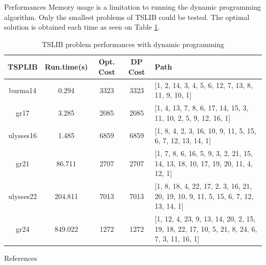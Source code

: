 \documentclass[../report.tex]{subfiles}
\begin{document}
\begin{subsection}{Performances}
Memory usage is a limitation to running the dynamic programming algorithm. Only the smallest problems of TSLIB could be tested. The optimal solution is obtained each time as seen on Table \ref{table:dpt1}.

\begin{table}[!h]
\centering
\footnotesize
\begin{tabular}{||c||c|c|c|l||}
\hline
\hline
\bf TSPLIB & \bf Run.time(s) & \bf Opt. Cost & \bf DP Cost & \bf Path \\
\hline
\hline
burma14 & 0.294 & 3323 & 3323 & [1, 2, 14, 3, 4, 5, 6, 12, 7, 13, 8, 11, 9, 10, 1]\\
gr17	& 3.285 & 2085 & 2085 &  [1, 4, 13, 7, 8, 6, 17, 14, 15, 3, 11, 10, 2, 5, 9, 12, 16, 1] \\
ulysses16 & 1.485	 & 6859 & 6859 & [1, 8, 4, 2, 3, 16, 10, 9, 11, 5, 15, 6, 7, 12, 13, 14, 1] \\
gr21& 86.711 & 2707 & 2707 &	[1, 7, 8, 6, 16, 5, 9, 3, 2, 21, 15, 14, 13, 18, 10, 17, 19, 20, 11, 4, 12, 1]\\
ulysses22 & 204.811 &	7013 & 7013 & [1, 8, 18, 4, 22, 17, 2, 3, 16, 21, 20, 19, 10, 9, 11, 5, 15, 6, 7, 12, 13, 14, 1]\\
gr24	& 849.022 & 1272 & 1272 &	[1, 12, 4, 23, 9, 13, 14, 20, 2, 15, 19, 18, 22, 17, 10, 5, 21, 8, 24, 6, 7, 3, 11, 16, 1]\\
\hline
\hline
\end{tabular}
\caption{TSLIB problem performances with dynamic programming}
\label{table:dpt1}
\end{table}

\end{subsection}

\begin{subsection}{References}



\end{subsection}
\end{document}
